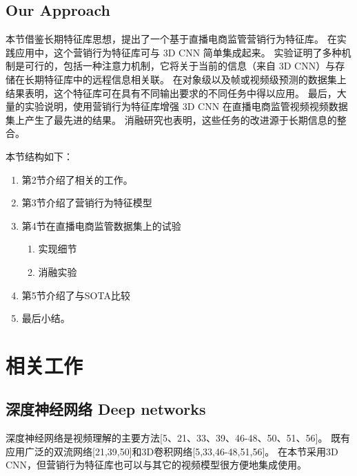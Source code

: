 \subsection{Our Approach}
本节借鉴长期特征库思想，提出了一个基于直播电商监管营销行为特征库。
在实践应用中，这个营销行为特征库可与 3D CNN 简单集成起来。
实验证明了多种机制是可行的，包括一种注意力机制，它将关于当前的信息（来自 3D CNN）与存储在长期特征库中的远程信息相关联。
在对象级以及帧或视频级预测的数据集上结果表明，这个特征库可在具有不同输出要求的不同任务中得以应用。
最后，大量的实验说明，使用营销行为特征库增强 3D CNN 在直播电商监管视频视频数据集上产生了最先进的结果。
消融研究也表明，这些任务的改进源于长期信息的整合。

本节结构如下：

\begin{enumerate}
    \item 第2节介绍了相关的工作。

    \item 第3节介绍了营销行为特征模型

    \item 第4节在直播电商监管数据集上的试验
        \begin{enumerate}
            \item 实现细节
            \item 消融实验
        \end{enumerate}
    \item 第5节介绍了与SOTA比较
    \item 最后小结。
\end{enumerate}

\section{相关工作}

\subsection{深度神经网络 Deep networks}

深度神经网络是视频理解的主要方法[5、21、33、39、46-48、50、51、56]。
既有应用广泛的双流网络[21,39,50]和3D卷积网络[5,33,46-48,51,56]。
在本节采用3D CNN，但营销行为特征库也可以与其它的视频模型很方便地集成使用。

